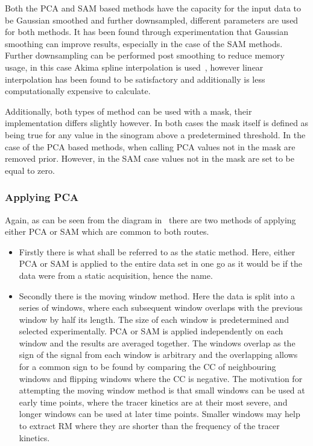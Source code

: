                     Both the \gls{PCA} and \gls{SAM} based methods have the capacity for the input data to be Gaussian smoothed and further downsampled, different parameters are used for both methods. It has been found through experimentation that Gaussian smoothing can improve results, especially in the case of the \gls{SAM} methods. Further downsampling can be performed post smoothing to reduce memory usage, in this case Akima spline interpolation is used~, however linear interpolation has been found to be satisfactory and additionally is less computationally expensive to calculate.
                        
                    Additionally, both types of method can be used with a mask, their implementation differs slightly however. In both cases the mask itself is defined as being true for any value in the sinogram above a predetermined threshold. In the case of the \gls{PCA} based methods, when calling \gls{PCA} values not in the mask are removed prior. However, in the \gls{SAM} case values not in the mask are set to be equal to zero.
                
                \subsubsection{Applying PCA} \label{sec:pca_data_driven_surrogate_signal_extraction_methods_for_dynamic_pet_methods_applying_pca}
                    Again, as can be seen from the diagram in~ there are two methods of applying either \gls{PCA} or \gls{SAM} which are common to both routes.
                    
                    \begin{itemize}
                        \item Firstly there is what shall be referred to as the static method. Here, either \gls{PCA} or \gls{SAM} is applied to the entire data set in one go as it would be if the data were from a static acquisition, hence the name.
                        
                        \item Secondly there is the moving window method. Here the data is split into a series of windows, where each subsequent window overlaps with the previous window by half its length. The size of each window is predetermined and selected experimentally. \gls{PCA} or \gls{SAM} is applied independently on each window and the results are averaged together. The windows overlap as the sign of the signal from each window is arbitrary and the overlapping allows for a common sign to be found by comparing the \gls{CC} of neighbouring windows and flipping windows where the \gls{CC} is negative. The motivation for attempting the moving window method is that small windows can be used at early time points, where the tracer kinetics are at their most severe, and longer windows can be used at later time points. Smaller windows may help to extract \gls{RM} where they are shorter than the frequency of the tracer kinetics.
                    \end{itemize}
                    
